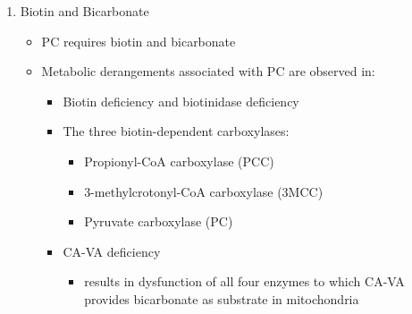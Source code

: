 \documentclass{scrartcl}
\begin{document}
\begin{enumerate}
\item Biotin and Bicarbonate
\label{sec:org375fb60}
\begin{itemize}
\item PC requires biotin and bicarbonate
\item Metabolic derangements associated with PC are observed in:
\begin{itemize}
\item Biotin deficiency and biotinidase deficiency
\item The three biotin-dependent carboxylases:
\begin{itemize}
\item Propionyl-CoA carboxylase (PCC)
\item 3-methylcrotonyl-CoA carboxylase (3MCC)
\item Pyruvate carboxylase (PC)
\end{itemize}

\item CA-VA deficiency
\begin{itemize}
\item results in dysfunction of all four enzymes to which CA-VA
provides bicarbonate as substrate in mitochondria
\end{itemize}
\end{itemize}
\end{itemize}


\end{enumerate}
\end{document}
